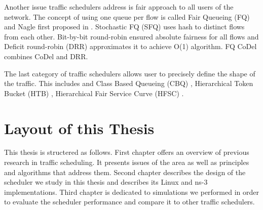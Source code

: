 Another issue traffic schedulers address is fair approach to all users of the network. The concept of using one queue per flow is called Fair Queueing (FQ) and Nagle first proposed in \cite{Nagle:FQ}. Stochastic FQ (SFQ) \cite{SFQ} uses hash to distinct flows from each other. Bit-by-bit round-robin \cite{demers1989analysis} ensured absolute fairness for all flows and Deficit round-robin (DRR) \cite{EffDRR} approximates it to achieve O(1) algorithm. FQ CoDel \cite{fq_codel} combines CoDel and DRR.

The last category of traffic schedulers allows user to precisely  define the shape of the traffic. This includes and Class Based Queueing (CBQ) \cite{CBQ}, Hierarchical Token Bucket (HTB) \cite{HTB},  Hierarchical Fair Service Curve (HFSC) \cite{HFSC}.

\section*{Layout of this Thesis}
This thesis is structered as follows. First chapter offers an overview of previous research in traffic scheduling. It presents issues of the area as well as principles and algorithms that address them. Second chapter describes the design of the scheduler we study in this thesis and describes its Linux and ns-3 implementations. Third chapter is dedicated to simulations we performed in order to evaluate the scheduler performance and compare it to other traffic schedulers.


